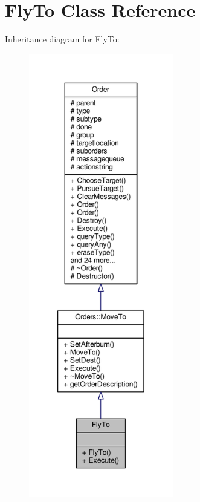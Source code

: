 \hypertarget{classFlyTo}{}\section{Fly\+To Class Reference}
\label{classFlyTo}


Inheritance diagram for Fly\+To\+:
\nopagebreak
\begin{figure}[H]
\begin{center}
\leavevmode
\includegraphics[height=550pt]{df/d88/classFlyTo__inherit__graph}
\end{center}
\end{figure}


